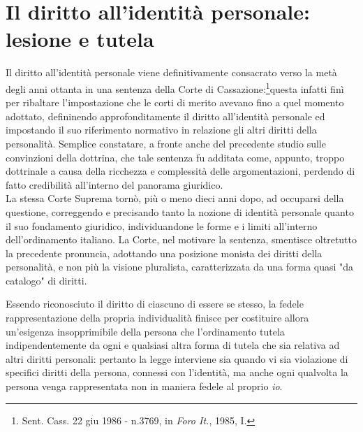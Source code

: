 \section{Il diritto all'identità personale: lesione e tutela}
Il diritto all'identità personale viene definitivamente consacrato verso la metà degli anni ottanta in una sentenza della Corte di Cassazione:\footnote{Sent. Cass. 22 giu 1986 - n.3769, in \textit{Foro It.}, 1985, I.}questa infatti finì per ribaltare l’impostazione che le corti di merito avevano fino a quel momento adottato, defininendo approfonditamente il diritto all’identità personale ed impostando il suo riferimento normativo in relazione gli altri diritti della personalità. Semplice constatare, a fronte anche del precedente studio sulle convinzioni della dottrina, che tale sentenza fu additata come, appunto, troppo dottrinale a causa della ricchezza e complessità delle argomentazioni, perdendo di fatto credibilità all'interno del panorama giuridico. 
\\La stessa Corte Suprema tornò, più o meno dieci anni dopo, ad occuparsi della questione, correggendo e precisando tanto la nozione di identità personale quanto il suo fondamento giuridico, individuandone le forme e i limiti all'interno dell’ordinamento italiano. La Corte, nel motivare la sentenza, smentisce oltretutto la precedente pronuncia, adottando una posizione monista dei diritti della personalità, e non più la visione pluralista, caratterizzata da una forma quasi "da catalogo" di diritti.

Essendo riconosciuto il diritto di ciascuno di essere se stesso, la fedele rappresentazione della propria individualità finisce per costituire allora un’esigenza insopprimibile della persona che l’ordinamento tutela indipendentemente da ogni e qualsiasi altra forma di tutela che sia relativa ad altri diritti personali: pertanto la legge interviene sia quando vi sia violazione di specifici diritti della persona, connessi con l’identità, ma anche ogni qualvolta la persona venga rappresentata non in maniera fedele al proprio \textit{io}.


